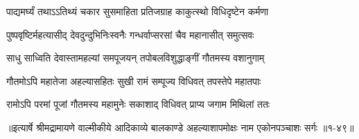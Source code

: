\twolineshloka
{पाद्यमर्घ्यं तथाऽऽतिथ्यं चकार सुसमाहिता}
{प्रतिजग्राह काकुत्स्थो विधिदृष्टेन कर्मणा} %

\twolineshloka
{पुष्पवृष्टिर्महत्यासीद् देवदुन्दुभिनिःस्वनैः}
{गन्धर्वाप्सरसां चैव महानासीत् समुत्सवः} %

\twolineshloka
{साधु साध्विति देवास्तामहल्यां समपूजयन्}
{तपोबलविशुद्धाङ्गीं गौतमस्य वशानुगाम्} %

\twolineshloka
{गौतमोऽपि महातेजा अहल्यासहितः सुखी}
{रामं सम्पूज्य विधिवत् तपस्तेपे महातपाः} %

\twolineshloka
{रामोऽपि परमां पूजां गौतमस्य महामुनेः}
{सकाशाद् विधिवत् प्राप्य जगाम मिथिलां ततः} %


॥इत्यार्षे श्रीमद्रामायणे वाल्मीकीये आदिकाव्ये बालकाण्डे अहल्याशापमोक्षः नाम एकोनपञ्चाशः सर्गः ॥१-४९॥
